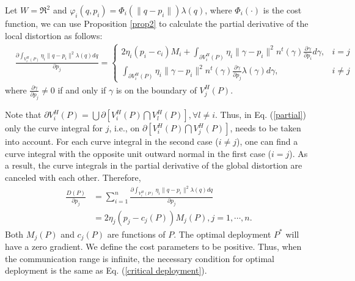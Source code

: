 \documentclass[journal,draftcls,onecolumn,12pt,twoside, narroweqnarray]{IEEEtran}
\begin{document}
\begin{IEEEproof}
Let $W=\Re^2$ and $\varphi_i(q,p_i)=\Phi_i(\|q-p_i\|)\lambda(q)$, where $\Phi_i(\cdot)$ is the cost function, we can use Proposition \ref{prop2} to calculate the partial derivative of the local distortion as follows:
\begin{equation}
\begin{aligned}
&\frac{\partial\int_{V^H_i(P)}\eta_i\|q-p_i\|^2\lambda(q)dq}{\partial p_j} =
\begin{cases}
2\eta_i(p_i-c_i)M_i + \int_{\partial V^H_i(P)}\eta_i\|\gamma-p_i\|^2n^t(\gamma)\frac{\partial \gamma}{\partial p_i}d\gamma,&i=j\\
\int_{\partial V^H_i(P)}\eta_i\|\gamma-p_i\|^2n^t(\gamma)\frac{\partial \gamma}{\partial p_j}\lambda(\gamma)d\gamma,&i\ne j
\end{cases}
\end{aligned}\label{partial}
\end{equation}
where $\frac{\partial \gamma}{\partial p_j}\ne0$ if and only if $\gamma$ is on the boundary of $V^H_j(P)$.

Note that $\partial V^H_i(P)=\bigcup \partial \left[V^H_i(P)\bigcap V^H_l(P)\right], \forall l\ne i$.
  Thus, in Eq. (\ref{partial}) only the curve integral for $j$, i.e.,  on $\partial \left[V^H_i(P)\bigcap V^H_j(P)\right]$, needs to be taken into account. For each curve integral in the second case ($i\ne j$), one can find a curve integral with the opposite unit outward normal in the first case ($i=j$). As a result, the curve integrals in the partial derivative of the global distortion are canceled with each other. Therefore,
\begin{equation}
\begin{aligned}
\frac{D(P)}{\partial p_j} &= \sum_{i=1}^{n}\frac{\partial \int_{V^H_i(P)}\eta_i\|q-p_i\|^2\lambda(q)dq}{\partial p_j}\\
&= 2\eta_j(p_j-c_j(P))M_j(P), j=1,\cdots,n.
\end{aligned}
\end{equation}
Both $M_j(P)$ and $c_j(P)$ are functions of $P$. The optimal deployment $P^{\ast}$ will have a zero gradient. We define the cost parameters to be positive. Thus, when the communication range is infinite, the necessary condition for optimal deployment is the same as Eq. (\ref{critical deployment}).
\end{IEEEproof}
\end{document}
